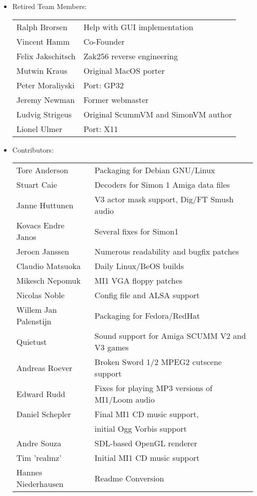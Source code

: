 \begin{itemize}
\item Retired Team Members:\\
  \begin{tabular}[h]{p{4cm}l}
    Ralph Brorsen        & Help with GUI implementation\\
    Vincent Hamm         & Co-Founder\\
    Felix Jakschitsch    & Zak256 reverse engineering\\
    Mutwin Kraus         & Original MacOS porter\\
    Peter Moraliyski     & Port: GP32\\
    Jeremy Newman        & Former webmaster\\
    Ludvig Strigeus      & Original ScummVM and SimonVM author\\
    Lionel Ulmer         & Port: X11\\
  \end{tabular}
\item Contributors:\\
  \begin{tabular}{p{4cm}l}
    Tore Anderson        & Packaging for Debian GNU/Linux\\
    Stuart Caie          & Decoders for Simon 1 Amiga data files\\
    Janne Huttunen       & V3 actor mask support, Dig/FT Smush audio\\
    Kovacs Endre Janos   & Several fixes for Simon1\\
    Jeroen Janssen       & Numerous readability and bugfix patches\\
    Claudio Matsuoka     & Daily Linux/BeOS builds \\
    Mikesch Nepomuk      & MI1 VGA floppy patches\\
    Nicolas Noble        & Config file and ALSA support\\
    Willem Jan Palenstijn& Packaging for Fedora/RedHat\\
    Quietust             & Sound support for Amiga SCUMM V2 and V3 games\\
    Andreas Roever       & Broken Sword 1/2 MPEG2 cutscene support\\
    Edward Rudd          & Fixes for playing MP3 versions of MI1/Loom audio\\
    Daniel Schepler      & Final MI1 CD music support, \\
                         & initial Ogg Vorbis support\\
    Andre Souza          & SDL-based OpenGL renderer\\
    Tim 'realmz'         & Initial MI1 CD music support\\
    Hannes Niederhausen  & Readme Conversion\\
  \end{tabular}
  

\end{itemize}
